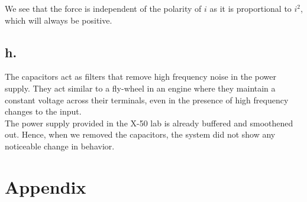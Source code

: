 \documentclass{article}
\newcommand{\xxx}[1]{\textcolor{red}{#1}}
\theoremstyle{plain}
\theoremstyle{definition}
\theoremstyle{remark}
\begin{document}
We see that the force is independent of the polarity of $i$ as it is proportional to $i^2$, which will always be positive.


\subsection*{h.}
The capacitors act as filters that remove high frequency noise in the power supply. They act similar to a fly-wheel in an engine where they maintain a constant voltage across their terminals, even in the presence of high frequency changes to the input.\\

The power supply provided in the X-50 lab is already buffered and smoothened out. Hence, when we removed the capacitors, the system did not show any noticeable change in behavior.
%
%
%
\newpage
\section*{Appendix}
\end{document}
